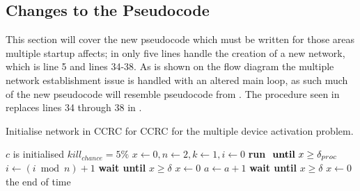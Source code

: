 \subsection{Changes to the Pseudocode}
This section will cover the new pseudocode which must be written for those areas multiple startup affects; in  only five lines handle the creation of a new network, which is line 5 and lines 34-38.
As is shown on the flow diagram  the multiple network establishment issue is handled with an altered main loop, as such much of the new pseudocode will resemble pseudocode from .
The procedure seen in  replaces lines 34 through 38 in . 
\begin{algorithm}
\caption{Initialise network in CCRC for CCRC for the multiple device activation problem.}
\label{lst:networkMultiStartCCRC2}
\begin{algorithmic}[1]
\Require $c$ is initialised
\Require $kill_{chance} = 5\%$ 
    \State $x \gets 0, n \gets 2, k \gets 1, i \gets 0$
    \Repeat {}
        \State \textbf{run}  $\text{ \textbf{until} }x \ge \delta_{proc}$
        \State $i \gets (i \bmod n) + 1$ 
            \State {} 
            \State {}
        \Else
                    \State {}
                    \State {}
                        \State \textbf{wait until } $x \ge \delta$  
                        \State $x \gets 0$
                        \State {}
                    \EndIf
                \Else
                     
                        \State $a \gets a + 1$
                        \State {}
                    \EndIf
                \EndIf
            \EndWhile
        \EndIf
        \State \textbf{wait until } $x \ge \delta$  
        \State $x \gets 0$
        \State {}
    \Until the end of time
\EndProcedure    
\end{algorithmic}
    
\end{algorithm}


